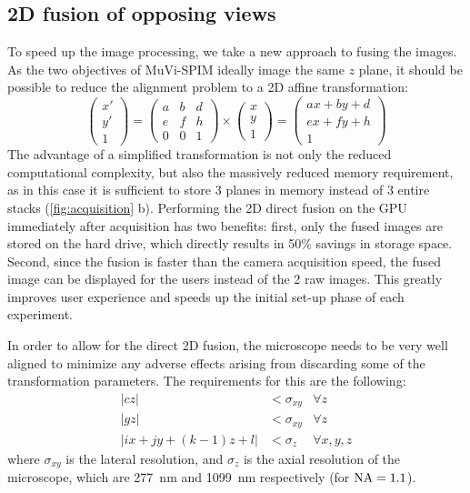 \subsection{2D fusion of opposing views}
To speed up the image processing, we take a new approach to fusing the images. As the two objectives of MuVi-SPIM ideally image the same $z$ plane, it should be possible to reduce the alignment problem to a 2D affine transformation:
\[ 
\begin{pmatrix}
x'\\
y'\\
1
\end{pmatrix}
=
\begin{pmatrix}
a & b & d\\ 
e & f & h \\
0 & 0 & 1
\end{pmatrix}
\times
\begin{pmatrix}
x\\
y\\
1
\end{pmatrix}
=
\begin{pmatrix}
a x + b y + d\\ 
e x + f y + h\\
1
\end{pmatrix}
\]
The advantage of a simplified transformation is not only the reduced computational complexity, but also the massively reduced memory requirement, as in this case it is sufficient to store 3 planes in memory instead of 3 entire stacks (\autoref{fig:acquisition} b). Performing the 2D direct fusion on the GPU immediately after acquisition has two benefits: first, only the fused images are stored on the hard drive, which directly results in 50\% savings in storage space. Second, since the fusion is faster than the camera acquisition speed, the fused image can be displayed for the users instead of the 2 raw images. This greatly improves user experience and speeds up the initial set-up phase of each experiment.

In order to allow for the direct 2D fusion, the microscope needs to be very well aligned to minimize any adverse effects arising from discarding some of the transformation parameters. The requirements for this are the following:
\begin{align}
\left| c z \right| &< \sigma_{xy} & \forall z \label{eq:req1}\\
\left| g z \right|  &< \sigma_{xy} & \forall z \label{eq:req2}\\
\left| i x + j y + (k-1)  z + l \right| &< \sigma_z & \forall x, y, z  \label{eq:req3}
\end{align}
where $\sigma_{xy}$ is the lateral resolution, and $\sigma_z$ is the axial resolution of the microscope, which are \SI{277}{nm} and \SI{1099}{nm} respectively (for $\operatorname{NA}=1.1$). 

